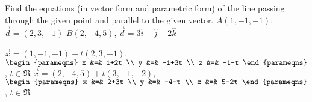 
\begin{Exercise}[
name={},
title={}, 
difficulty=0,
origin={\cite{SM}}]
Find the equations (in vector form and parametric form) of the line passing through the given point and parallel to the given vector.
\Question $A(1,-1,-1)$, $\vec{d}=(2,3,-1)$
\Question $B(2,-4,5)$, $\vec{d}=3\hat{i}-\hat{j}-2\hat{k}$
\end{Exercise}

\begin{Answer}
\Question $\vec{x}=(1,-1,-1)+t(2,3,-1)$, $\begin{parameqns} x &=& 1+2t \\ y &=& -1+3t \\ z &=& -1-t \end{parameqns}$, $t\in\Re$
\Question $\vec{x}=(2,-4,5)+t(3,-1,-2)$, $\begin{parameqns} x &=& 2+3t \\ y &=& -4-t \\ z &=& 5-2t \end{parameqns}$, $t\in\Re$
\end{Answer}
